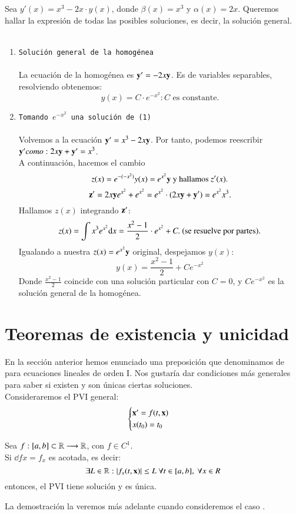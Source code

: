 \begin{eg}
    Sea $y'(x) = x^3 - 2x\cdot y(x)$, donde $\beta(x) = x^3$ y $\alpha(x) = 2x$. Queremos hallar la expresión de todas las posibles soluciones, es decir, la solución general.\\\\
    \begin{enumerate}
        \item \texttt{Solución general de la homogénea}\\\\
        La ecuación de la homogénea es $\mathbf{y}'=-2x\mathbf{y}$. Es de variables separables, resolviendo obtenemos:
        $$
            y(x) = C \cdot e^{-x^2} : C \text{ es constante.}
        $$
        \item \texttt{Tomando $e^{-x^2}$ una solución de (1)}\\\\
        Volvemos a la ecuación $\mathbf{y}' = x^3-2x\mathbf{y}$. Por tanto, podemos reescribir $\mathbf{y}' como: 2x\mathbf{y} + \mathbf{y}' = x^3$.\\
        A continuación, hacemos el cambio
        $$
            z(x) = e^{-(-x^2)} y(x) = e^{x^2} \mathbf{y} \text{ y hallamos $z'(x)$.}
        $$
        $$
            \mathbf{z}' = 2x\mathbf{y}e^{x^2} + e^{x^2} = e^{x^2}\cdot (2x\mathbf{y}+\mathbf{y}') = e^{x^2} x^3.
        $$
        Hallamos $z(x)$ integrando $\mathbf{z}'$:
        $$
            z(x) = \int x^3 e^{x^2} \mathrm{d} x = \frac{x^2-1}{2} \cdot e^{x^2} + C.\text{ (se resuelve por partes).}
        $$
        Igualando a nuestra $z(x) = e^{x^2} \mathbf{y}$ original, despejamos $y(x)$:
        $$
            y(x) = \frac{x^2-1}{2} + C e^{-x^2}
        $$
        Donde $\frac{x^2-1}{2}$ coincide con una solución particular con $C = 0$, y $C e^{-x^2}$ es la solución general de la homogénea.
    \end{enumerate}
\end{eg}
\section{Teoremas de existencia y unicidad}
En la sección anterior hemos enunciado una preposición que denominamos de  para ecuaciones lineales de orden I. Nos gustaría dar condiciones más generales para saber si existen y son únicas ciertas soluciones.\\
Consideraremos el PVI general:
$$
    \begin{cases}
        \mathbf{x'} = f(t, \mathbf{x}) \\ x(t_0) = t_0
    \end{cases}
$$
\begin{thm}
    Sea $f: [a,b] \subset \mathbb{R} \longrightarrow \mathbb{R}$, con $f \in C^1$.\\Si $\dd{f}{x} = f_x$ es acotada,  es decir:
    $$
        \exists L \in \mathbb{R} : |f_x(t, \mathbf{x})| \leq L\ \forall t\in[a,b],\ \forall x\in R
    $$ entonces, el PVI tiene solución y es única.
\end{thm}
La demostración la veremos más adelante cuando consideremos el caso .


